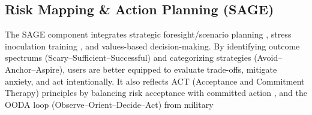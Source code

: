 \documentclass{article}
\begin{document}
\subsection{Risk Mapping \& Action Planning (SAGE)}
The SAGE component integrates strategic foresight/scenario planning \cite{schoemaker1995scenario}, stress inoculation training \cite{meichenbaum1985stress}, and values-based decision-making. By identifying outcome spectrums (Scary–Sufficient–Successful) and categorizing strategies (Avoid–Anchor–Aspire), users are better equipped to evaluate trade-offs, mitigate anxiety, and act intentionally. It also reflects ACT (Acceptance and Commitment Therapy) principles by balancing risk acceptance with committed action \cite{hayes1999acceptance}, and the OODA loop (Observe–Orient–Decide–Act) from military
\end{document}
